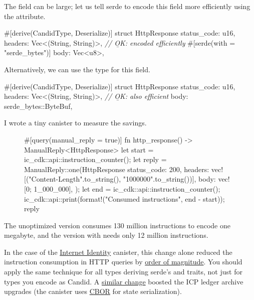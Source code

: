 \documentclass{article}
\begin{document}
The  field can be large; let us tell serde to encode this field more efficiently using the \href{https://serde.rs/field-attrs.html#with}{} attribute.

\begin{code}[good]
#[derive(CandidType, Deserialize)]
struct HttpResponse {
    status_code: u16,
    headers: Vec<(String, String)>,
    \emph{// \b{OK}: encoded efficiently}
    #[serde(with = "serde_bytes")]
    body: Vec<u8>,
}
\end{code}

Alternatively, we can use the \href{https://docs.serde.rs/serde_bytes/struct.ByteBuf.html}{} type for this field.

\begin{code}[good]
#[derive(CandidType, Deserialize)]
struct HttpResponse {
    status_code: u16,
    headers: Vec<(String, String)>,
    \emph{// \b{OK}: also efficient}
    body: serde_bytes::ByteBuf,
}
\end{code}

I wrote a tiny canister to measure the savings.

\begin{figure}
\begin{code}[rust]
#[query(manual_reply = true)]
fn http_response() -> ManualReply<HttpResponse> {
    let start = ic_cdk::api::instruction_counter();
    let reply = ManualReply::one(HttpResponse {
        status_code: 200,
        headers: vec![("Content-Length".to_string(), "1000000".to_string())],
        body: vec![0; 1_000_000],
    });
    let end = ic_cdk::api::instruction_counter();
    ic_cdk::api::print(format!("Consumed {} instructions", end - start));
    reply
}
\end{code}
\end{figure}

The unoptimized version consumes 130 million instructions to encode one megabyte, and the version with  needs only 12 million instructions.

In the case of the \href{https://github.com/dfinity/internet-identity/}{Internet Identity} canister, this change alone reduced the instruction consumption in HTTP queries by \href{https://github.com/dfinity/internet-identity/pull/184}{order of magnitude}.
You should apply the same technique for all types deriving serde's  and  traits, not just for types you encode as Candid.
A \href{https://github.com/dfinity/ic/commit/1b98a5d984176b1c948d0cb92227d88ad5ee8044}{similar change} boosted the ICP ledger archive upgrades (the canister uses \href{https://cbor.io}{CBOR} for state serialization).
\end{document}
